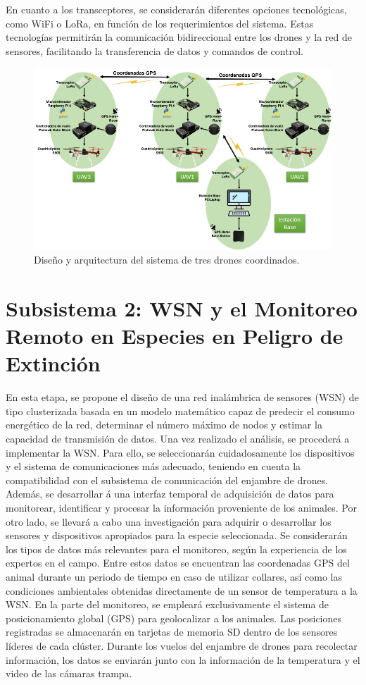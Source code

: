 En cuanto a los transceptores, se considerarán diferentes opciones tecnológicas, como WiFi o LoRa, en función de los requerimientos del sistema. Estas tecnologías permitirán la comunicación bidireccional entre los drones y la red de sensores, facilitando la transferencia de datos y comandos de control.


\begin{figure}[h]
    \centering
    \includegraphics[width=0.9\linewidth]{imagenes/img2_disenho_drones_coordinados.jpg}
    \caption{Diseño y arquitectura del sistema de tres drones coordinados.}
    \label{fig:enter-label}
\end{figure}
\newpage
\section{Subsistema 2: WSN y el Monitoreo Remoto en Especies en Peligro de
Extinción}
En esta etapa, se propone el diseño de una red inalámbrica de sensores (WSN) de tipo clusterizada basada en un modelo matemático capaz de predecir el consumo energético de la red, determinar el número máximo de nodos y estimar la capacidad de transmisión de datos.
Una vez realizado el análisis, se procederá a implementar la WSN. Para ello, se seleccionarán cuidadosamente los dispositivos y el sistema de comunicaciones más adecuado, teniendo en cuenta la compatibilidad con el subsistema de comunicación del enjambre de drones. Además, se desarrollar á una interfaz temporal de adquisición de datos para monitorear, identificar y procesar la información proveniente de los animales.
Por otro lado, se llevará a cabo una investigación para adquirir o desarrollar los sensores y dispositivos apropiados para la especie seleccionada. Se considerarán los tipos de datos más relevantes para el monitoreo, según la experiencia de los expertos en el campo. Entre estos datos se encuentran las coordenadas GPS del animal durante un periodo de tiempo en caso de utilizar collares, así como las condiciones ambientales obtenidas directamente de un sensor de temperatura a la WSN.
En la parte del monitoreo, se empleará exclusivamente el sistema de posicionamiento global (GPS) para geolocalizar a los animales. Las posiciones registradas se almacenarán en tarjetas de memoria SD dentro de los sensores líderes de cada clúster. Durante los vuelos del enjambre de drones para recolectar información, los datos se enviarán junto con la información de la temperatura y el video de las cámaras trampa.

